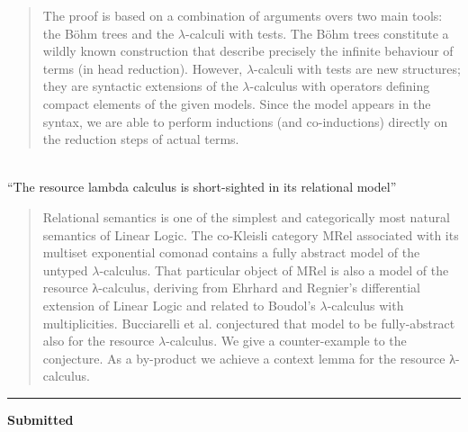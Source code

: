 \documentclass{article}[11pt]
\begin{document}
\begin{itemize}[itemindent=0em,leftmargin=6em, labelsep=1em]
\begin{quote}
  The proof is based on a combination of arguments overs two main tools: the B\"ohm trees and the $\lambda$-calculi with tests. The B\"ohm trees constitute a wildly known construction that describe precisely the infinite behaviour of terms (in head reduction). However, $\lambda$-calculi with tests are new structures; they are syntactic extensions of the $\lambda$-calculus with operators defining compact elements of the given models. Since the model appears in the syntax, we are able to perform inductions (and
co-inductions) directly on the reduction steps of actual terms.
\end{quote}
\\ ``The resource lambda calculus is short-sighted in its relational model''\vspace{-0.5em}
\begin{quote}
  Relational semantics is one of the simplest and categorically
  most natural semantics of Linear Logic. The co-Kleisli category MRel
  associated with its multiset exponential comonad contains a fully
  abstract model of the untyped $\lambda$-calculus. That particular object of MRel
  is also a model of the resource λ-calculus, deriving from Ehrhard and
  Regnier’s differential extension of Linear Logic and related to Boudol’s
  $\lambda$-calculus with multiplicities. Bucciarelli et al. conjectured that model
  to be fully-abstract also for the resource $\lambda$-calculus. We give a counter-example to the conjecture. As a by-product we achieve a context lemma for the resource λ-calculus.
\end{quote}
\end{itemize}
\noindent \rule{5.5em}{1pt} {\bf Submitted}  \nobreak
\end{document}
